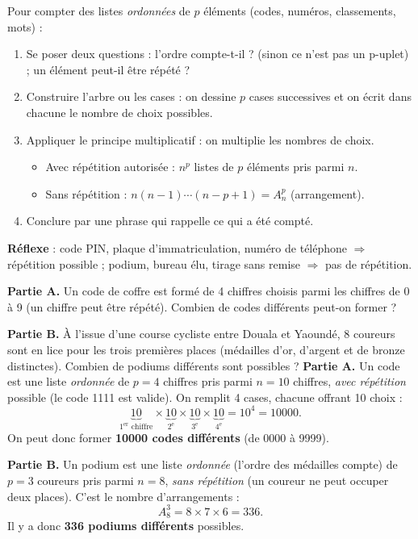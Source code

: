 \documentclass[11pt]{article}
\newcommand{\cle}[1]{{\popxbold\color{popdark}#1}}
\begin{document}
\begin{methode}
Pour compter des listes \emph{ordonnées} de $p$ éléments (codes, numéros, classements, mots) :
\begin{enumerate}
\item \cle{Se poser deux questions} : l'ordre compte-t-il ? (sinon ce n'est pas un p-uplet) ; un élément peut-il être répété ?
\item \cle{Construire l'arbre ou les cases} : on dessine $p$ cases successives et on écrit dans chacune le nombre de choix possibles.
\item \cle{Appliquer le principe multiplicatif} : on multiplie les nombres de choix.
\begin{itemize}
\item Avec répétition autorisée : $n^p$ listes de $p$ éléments pris parmi $n$.
\item Sans répétition : $n(n-1)\cdots(n-p+1)=A_n^p$ (arrangement).
\end{itemize}
\item \cle{Conclure} par une phrase qui rappelle ce qui a été compté.
\end{enumerate}
\textbf{Réflexe} : code PIN, plaque d'immatriculation, numéro de téléphone $\Rightarrow$ répétition possible ; podium, bureau élu, tirage sans remise $\Rightarrow$ pas de répétition.
\end{methode}

\begin{exoresolu}
\textbf{Partie A.} Un code de coffre est formé de 4 chiffres choisis parmi les chiffres de 0 à 9 (un chiffre peut être répété). Combien de codes différents peut-on former ?

\textbf{Partie B.} À l'issue d'une course cycliste entre Douala et Yaoundé, 8 coureurs sont en lice pour les trois premières places (médailles d'or, d'argent et de bronze distinctes). Combien de podiums différents sont possibles ?
\tcblower
\textbf{Partie A.} Un code est une liste \emph{ordonnée} de $p=4$ chiffres pris parmi $n=10$ chiffres, \emph{avec répétition} possible (le code 1111 est valide). On remplit 4 cases, chacune offrant 10 choix :
\[ \underbrace{10}_{1^{\text{er}}\text{ chiffre}}\times\underbrace{10}_{2^{\text{e}}}\times\underbrace{10}_{3^{\text{e}}}\times\underbrace{10}_{4^{\text{e}}}=10^4=\num{10000}. \]
On peut donc former \textbf{\num{10000} codes différents} (de 0000 à 9999).

\textbf{Partie B.} Un podium est une liste \emph{ordonnée} (l'ordre des médailles compte) de $p=3$ coureurs pris parmi $n=8$, \emph{sans répétition} (un coureur ne peut occuper deux places). C'est le nombre d'arrangements :
\[ A_8^3=8\times 7\times 6=336. \]
Il y a donc \textbf{336 podiums différents} possibles.
\end{exoresolu}
\end{document}
